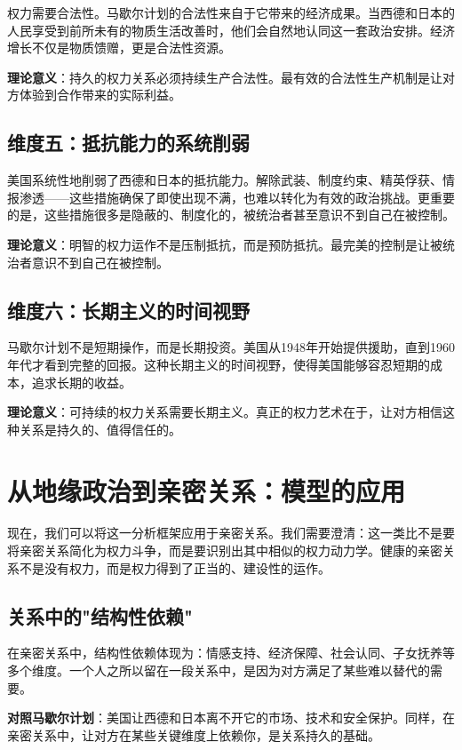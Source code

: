 \documentclass[12pt,a4paper]{article}
\begin{document}
权力需要合法性。马歇尔计划的合法性来自于它带来的经济成果。当西德和日本的人民享受到前所未有的物质生活改善时，他们会自然地认同这一套政治安排。经济增长不仅是物质馈赠，更是合法性资源。

\textbf{理论意义}：持久的权力关系必须持续生产合法性。最有效的合法性生产机制是让对方体验到合作带来的实际利益。

\subsection{维度五：抵抗能力的系统削弱}

美国系统性地削弱了西德和日本的抵抗能力。解除武装、制度约束、精英俘获、情报渗透——这些措施确保了即使出现不满，也难以转化为有效的政治挑战。更重要的是，这些措施很多是隐蔽的、制度化的，被统治者甚至意识不到自己在被控制。

\textbf{理论意义}：明智的权力运作不是压制抵抗，而是预防抵抗。最完美的控制是让被统治者意识不到自己在被控制。

\subsection{维度六：长期主义的时间视野}

马歇尔计划不是短期操作，而是长期投资。美国从1948年开始提供援助，直到1960年代才看到完整的回报。这种长期主义的时间视野，使得美国能够容忍短期的成本，追求长期的收益。

\textbf{理论意义}：可持续的权力关系需要长期主义。真正的权力艺术在于，让对方相信这种关系是持久的、值得信任的。

\section{从地缘政治到亲密关系：模型的应用}

现在，我们可以将这一分析框架应用于亲密关系。我们需要澄清：这一类比不是要将亲密关系简化为权力斗争，而是要识别出其中相似的权力动力学。健康的亲密关系不是没有权力，而是权力得到了正当的、建设性的运作。

\subsection{关系中的"结构性依赖"}

在亲密关系中，结构性依赖体现为：情感支持、经济保障、社会认同、子女抚养等多个维度。一个人之所以留在一段关系中，是因为对方满足了某些难以替代的需要。

\textbf{对照马歇尔计划}：美国让西德和日本离不开它的市场、技术和安全保护。同样，在亲密关系中，让对方在某些关键维度上依赖你，是关系持久的基础。
\end{document}
